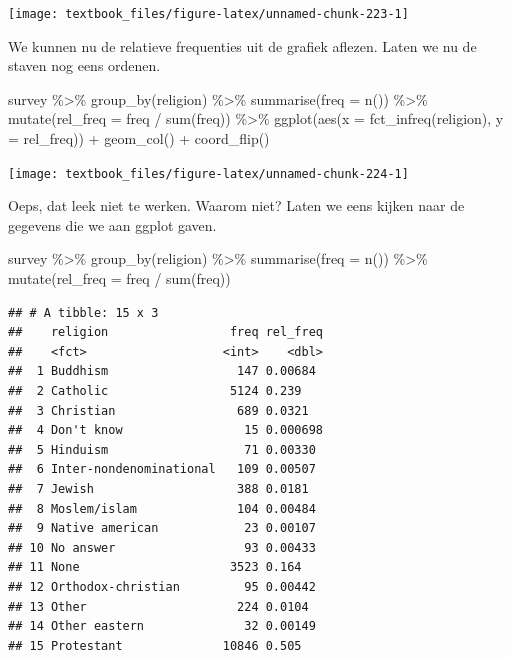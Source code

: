 \documentclass[]{tufte-book}
\newenvironment{Shaded}{}{}
\newcommand{\AttributeTok}[1]{\textcolor[rgb]{0.49,0.56,0.16}{#1}}
\newcommand{\FunctionTok}[1]{\textcolor[rgb]{0.02,0.16,0.49}{#1}}
\newcommand{\NormalTok}[1]{#1}
\newcommand{\SpecialCharTok}[1]{\textcolor[rgb]{0.25,0.44,0.63}{#1}}
\begin{document}
\texttt{[image: textbook\_files/figure-latex/unnamed-chunk-223-1]}

We kunnen nu de relatieve frequenties uit de grafiek aflezen. Laten we nu de staven nog eens ordenen.

\begin{Shaded}
\begin{Highlighting}[]
\NormalTok{survey }\SpecialCharTok{\%\textgreater{}\%}
  \FunctionTok{group\_by}\NormalTok{(religion) }\SpecialCharTok{\%\textgreater{}\%}
  \FunctionTok{summarise}\NormalTok{(}\AttributeTok{freq =} \FunctionTok{n}\NormalTok{()) }\SpecialCharTok{\%\textgreater{}\%}
  \FunctionTok{mutate}\NormalTok{(}\AttributeTok{rel\_freq =}\NormalTok{ freq }\SpecialCharTok{/} \FunctionTok{sum}\NormalTok{(freq)) }\SpecialCharTok{\%\textgreater{}\%}
  \FunctionTok{ggplot}\NormalTok{(}\FunctionTok{aes}\NormalTok{(}\AttributeTok{x =} \FunctionTok{fct\_infreq}\NormalTok{(religion), }\AttributeTok{y =}\NormalTok{ rel\_freq)) }\SpecialCharTok{+}
  \FunctionTok{geom\_col}\NormalTok{() }\SpecialCharTok{+}
  \FunctionTok{coord\_flip}\NormalTok{()}
\end{Highlighting}
\end{Shaded}

\texttt{[image: textbook\_files/figure-latex/unnamed-chunk-224-1]}

Oeps, dat leek niet te werken. Waarom niet? Laten we eens kijken naar de gegevens die we aan ggplot gaven.

\begin{Shaded}
\begin{Highlighting}[]
\NormalTok{survey }\SpecialCharTok{\%\textgreater{}\%}
  \FunctionTok{group\_by}\NormalTok{(religion) }\SpecialCharTok{\%\textgreater{}\%}
  \FunctionTok{summarise}\NormalTok{(}\AttributeTok{freq =} \FunctionTok{n}\NormalTok{()) }\SpecialCharTok{\%\textgreater{}\%}
  \FunctionTok{mutate}\NormalTok{(}\AttributeTok{rel\_freq =}\NormalTok{ freq }\SpecialCharTok{/} \FunctionTok{sum}\NormalTok{(freq))}
\end{Highlighting}
\end{Shaded}

\begin{verbatim}
## # A tibble: 15 x 3
##    religion                 freq rel_freq
##    <fct>                   <int>    <dbl>
##  1 Buddhism                  147 0.00684 
##  2 Catholic                 5124 0.239   
##  3 Christian                 689 0.0321  
##  4 Don't know                 15 0.000698
##  5 Hinduism                   71 0.00330 
##  6 Inter-nondenominational   109 0.00507 
##  7 Jewish                    388 0.0181  
##  8 Moslem/islam              104 0.00484 
##  9 Native american            23 0.00107 
## 10 No answer                  93 0.00433 
## 11 None                     3523 0.164   
## 12 Orthodox-christian         95 0.00442 
## 13 Other                     224 0.0104  
## 14 Other eastern              32 0.00149 
## 15 Protestant              10846 0.505
\end{verbatim}
\end{document}
